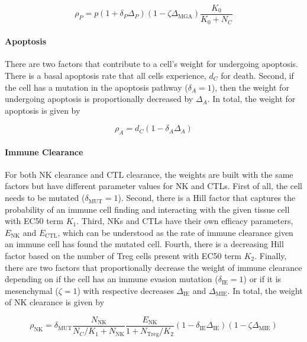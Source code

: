 \documentclass[11pt]{article}
\begin{document}
\begin{equation}\tag{2.1}
\rho_P = p(1+\delta_{P}\Delta_P)(1-\zeta \Delta_{\text{MGA}})\frac{K_0}{K_0+N_C}
\end{equation}

\paragraph{Apoptosis}
There are two factors that contribute to a cell's weight for undergoing apoptosis.
There is a basal apoptosis rate that all cells experience, $d_C$ for death.
Second, if the cell has a mutation in the apoptosis pathway ($\delta_A=1$), then the weight for undergoing apoptosis is proportionally decreased by $\Delta_A$.
In total, the weight for apoptosis is given by 

\begin{equation}\tag{2.2}
\rho_A = d_C(1-\delta_{A}\Delta_A)
\end{equation}

\paragraph{Immune Clearance}
For both NK clearance and CTL clearance, the weights are built with the same factors but have different parameter values for NK and CTLs.
First of all, the cell needs to be mutated ($\delta_{\text{MUT}}=1$).
Second, there is a Hill factor that captures the probability of an immune cell finding and interacting with the given tissue cell with EC50 term $K_1$.
Third, NKs and CTLs have their own efficacy parameters, $E_{\text{NK}}$ and $E_{\text{CTL}}$, which can be understood as the rate of immune clearance given an immune cell has found the mutated cell.
Fourth, there is a decreasing Hill factor based on the number of Treg cells present with EC50 term $K_2$.
Finally, there are two factors that proportionally decrease the weight of immune clearance depending on if the cell has an immune evasion mutation ($\delta_{\text{IE}}=1$) or if it is mesenchymal ($\zeta=1$) with respective decreases $\Delta_{\text{IE}}$ and $\Delta_{\text{MIE}}$.
In total, the weight of NK clearance is given by

\begin{equation}\tag{2.3}
\rho_{\text{NK}} =\delta_{\text{MUT}} \frac{N_{\text{NK}}}{N_C/K_{1}+N_{\text{NK}}}  \frac{E_{\text{NK}}}{1+N_{\text{Treg}}/K_2} (1-\delta_{\text{IE}}\Delta_{\text{IE}})(1-\zeta \Delta_{\text{MIE}})
\end{equation}
\end{document}
